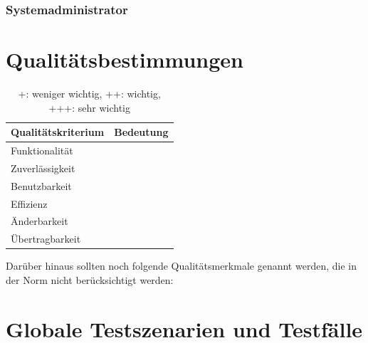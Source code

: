 \documentclass[a4paper]{scrreprt}
\newcounter{Lc}
\newcounter{Hc}
\newcommand{\resetAllCounter}{\setcounter{Lc}{0}\setcounter{Hc}{1}}
\begin{document}
             
            
        \subsection{Systemadministrator}
           
            
            
            
         
\chapter{Qualitätsbestimmungen}

\begin{table}[h]
 
    \begin{center}
    \begin{tabular}{|l|c|}
    \hline 
    \rule[-1ex]{0pt}{2.5ex} \textbf{Qualitätskriterium} & \textbf{Bedeutung} \\ 
    \hline 
    \rule[-1ex]{0pt}{2.5ex} Funktionalität &  \\ 
    \hline 
    \rule[-1ex]{0pt}{2.5ex} Zuverlässigkeit &  \\ 
    \hline 
    \rule[-1ex]{0pt}{2.5ex} Benutzbarkeit &  \\ 
    \hline 
    \rule[-1ex]{0pt}{2.5ex} Effizienz &  \\ 
    \hline 
    \rule[-1ex]{0pt}{2.5ex} Änderbarkeit &  \\ 
    \hline 
    \rule[-1ex]{0pt}{2.5ex} Übertragbarkeit &  \\ 
    \hline   
    \end{tabular}  
    \end{center}
    \caption{+: weniger wichtig, ++: wichtig, +++: sehr wichtig} 
    \label{qTabelle}   
\end{table}
    
Darüber hinaus sollten noch folgende Qualitätsmerkmale genannt werden, die in der Norm nicht berücksichtigt werden:
 
\resetAllCounter
\newcommand{\Test}[1]{\stepcounter{Lc}\textcolor{Brown}{\textbf{/T\arabic{Hc}0-\arabic{Lc}0/} #1} \\}
\newcommand{\RefFuncBlue}[1]{\textcolor{Blue}{\textbf{#1}}}
\newcommand{\RefFuncGreen}[1]{\textcolor{Green}{\textbf{#1}}}
\chapter{Globale Testszenarien und Testfälle}
 
\end{document}
